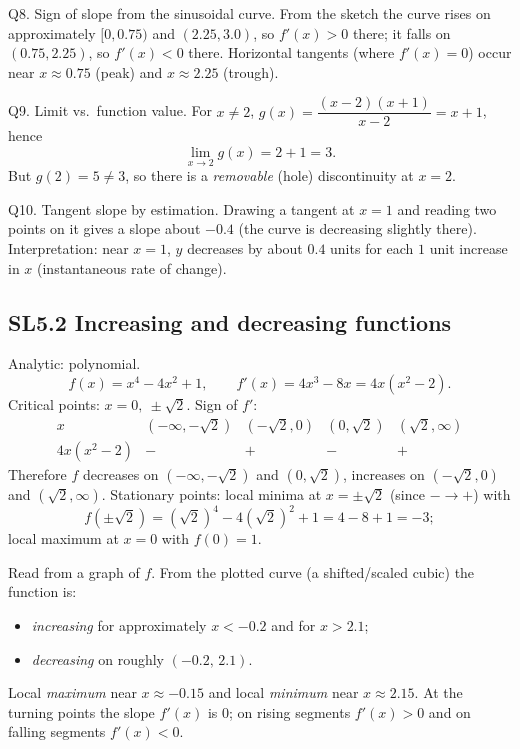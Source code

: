 \documentclass[11pt]{article}
\def\textbf#1{#1}%
\newcommand{\tocsubsection}[1]{\subsection{#1}}
\begin{document}
\begin{solution}
\textbf{Q8. Sign of slope from the sinusoidal curve.}
From the sketch the curve rises on approximately $[0,0.75)$ and $(2.25,3.0)$, so $f'(x)>0$ there; it falls on $(0.75,2.25)$, so $f'(x)<0$ there.  
Horizontal tangents (where $f'(x)=0$) occur near $x\approx\boxed{0.75}$ (peak) and $x\approx\boxed{2.25}$ (trough).
\end{solution}

\begin{solution}
\textbf{Q9. Limit vs.\ function value.}
For $x\ne2$, $g(x)=\dfrac{(x-2)(x+1)}{x-2}=x+1$, hence
\[
\lim_{x\to2}g(x)=2+1=\boxed{3}.
\]
But $g(2)=\boxed{5}\ne3$, so there is a \emph{removable} (hole) discontinuity at $x=2$.
\end{solution}

\begin{solution}
\textbf{Q10. Tangent slope by estimation.}
Drawing a tangent at $x=1$ and reading two points on it gives a slope about $\boxed{-0.4}$ (the curve is decreasing slightly there).  
Interpretation: near $x=1$, $y$ decreases by about $0.4$ units for each $1$ unit increase in $x$ (instantaneous rate of change).
\end{solution}




\tocsubsection{SL5.2 Increasing and decreasing functions}


\begin{solution}
\textbf{ Analytic: polynomial.}
\[
f(x)=x^{4}-4x^{2}+1,\qquad f'(x)=4x^{3}-8x=4x(x^{2}-2).
\]
Critical points: $x=0,\ \pm\sqrt{2}$.
Sign of $f'$:
\[
\begin{array}{c|cccc}
x & (-\infty,-\sqrt2) & (-\sqrt2,0) & (0,\sqrt2) & (\sqrt2,\infty)\\ \hline
4x(x^{2}-2) & - & + & - & +
\end{array}
\]
Therefore $f$ decreases on $(-\infty,-\sqrt2)$ and $(0,\sqrt2)$, increases on $(-\sqrt2,0)$ and $(\sqrt2,\infty)$.  
Stationary points: local minima at $x=\pm\sqrt2$ (since $-\to +$) with
\[
f(\pm\sqrt2)= (\sqrt2)^4-4(\sqrt2)^2+1=4-8+1=-3;
\]
local maximum at $x=0$ with $f(0)=1$.
\end{solution}

\begin{solution}
\textbf{Read from a graph of $f$.}
From the plotted curve (a shifted/scaled cubic) the function is:
\begin{itemize}
  \item \emph{increasing} for approximately $x< -0.2$ and for $x>2.1$;
  \item \emph{decreasing} on roughly $(-0.2,\,2.1)$.
\end{itemize}
Local \emph{maximum} near $x\approx -0.15$ and local \emph{minimum} near $x\approx 2.15$.  
At the turning points the slope $f'(x)$ is $0$; on rising segments $f'(x)>0$ and on falling segments $f'(x)<0$.
\end{solution}
\end{document}
